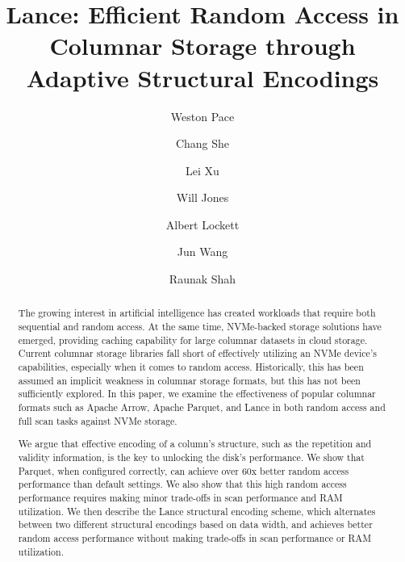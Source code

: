 \documentclass[sigconf, nonacm]{acmart}
\begin{document}
\title{Lance: Efficient Random Access in Columnar Storage through Adaptive Structural Encodings}

\author{Weston Pace}
\author{Chang She}
\author{Lei Xu}
\author{Will Jones}
\author{Albert Lockett}
\author{Jun Wang}
\author{Raunak Shah}

\begin{abstract}
The growing interest in artificial intelligence has created workloads that require both sequential and random access.  At the same time, NVMe-backed storage solutions have emerged, providing caching capability for large columnar datasets in cloud storage.  Current columnar storage libraries fall short of effectively utilizing an NVMe device's capabilities, especially when it comes to random access.  Historically, this has been assumed an implicit weakness in columnar storage formats, but this has not been sufficiently explored.  In this paper, we examine the effectiveness of popular columnar formats such as Apache Arrow, Apache Parquet, and Lance in both random access and full scan tasks against NVMe storage.

We argue that effective encoding of a column's structure, such as the repetition and validity information, is the key to unlocking the disk's performance.  We show that Parquet, when configured correctly, can achieve over 60x better random access performance than default settings. We also show that this high random access performance requires making minor trade-offs in scan performance and RAM utilization.  We then describe the Lance structural encoding scheme, which alternates between two different structural encodings based on data width, and achieves better random access performance without making trade-offs in scan performance or RAM utilization.
\end{abstract}

\maketitle
\end{document}
